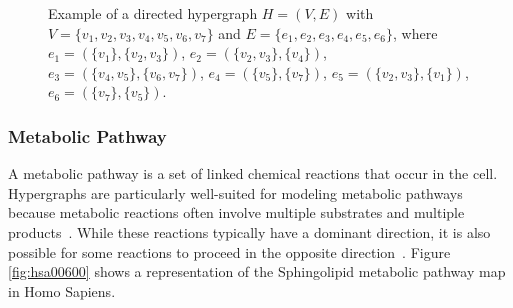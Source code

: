 \begin{figure}[H]
\centering
{}
\caption[Example of a directed hypergraph $H=(V,E)$]
{Example of a directed hypergraph $H=(V,E)$ with $V=\{v_1,v_2,v_3,v_4,v_5,v_6,v_7\}$ and $E=\{e_1,e_2,e_3,e_4,e_5,e_6\}$, where $e_1=(\{v_1\},\{v_2,v_3\})$, $e_2=(\{v_2,v_3\},\{v_4\})$, $e_3=(\{v_4,v_5\},\{v_6,v_7\})$, $e_4=(\{v_5\},\{v_7\})$, $e_5=(\{v_2,v_3\},\{v_1\})$, $e_6=(\{v_7\},\{v_5\})$.}
\label{fig:Hypergraph-example}
\end{figure}

\subsubsection{Metabolic Pathway}
A metabolic pathway is a set of linked chemical reactions that occur in the cell.
Hypergraphs are particularly well-suited for modeling metabolic pathways because metabolic reactions often involve multiple substrates and multiple products~\cite{Pearcy.Crofts.Chuzhanova:2014}. While these reactions typically have a dominant direction, it is also possible for some reactions to proceed in the opposite direction~\cite{SORRIBAS1989239}. Figure \ref{fig:hsa00600} shows a representation of the Sphingolipid metabolic pathway map in Homo Sapiens.

